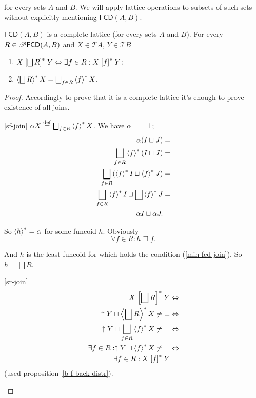 for every sets $A$ and $B$. We will apply lattice operations to
subsets of such sets without explicitly mentioning $\mathsf{FCD}(A,B)$.
\begin{thm}
\label{fcd-join-sets}$\mathsf{FCD}(A,B)$ is a complete lattice (for
every sets $A$ and $B$). For every $R\in\mathscr{P}\mathsf{FCD}(A,B)$
and $X\in\mathscr{T}A$, $Y\in\mathscr{T}B$
\begin{enumerate}
\item \label{sr-join}$X\rsuprel{\bigsqcup R}Y\Leftrightarrow\exists f\in
R:X\rsuprel fY$;
\item \label{sf-join}$\rsupfun{\bigsqcup R}X=\bigsqcup_{f\in R}\rsupfun fX$.
\end{enumerate}
\end{thm}
\begin{proof}
Accordingly \cite{pm:complete-lattice-criteria} to prove that it
is a complete lattice it's enough to prove existence of all joins.
\begin{widedisorder}
\item [{\ref{sf-join}}] $\alpha X\eqdef\bigsqcup_{f\in R}\rsupfun fX$.
We have $\alpha\bot=\bot$;
\begin{align*}
\alpha(I\sqcup J) & =\\
\bigsqcup_{f\in R}\rsupfun f(I\sqcup J) & =\\
\bigsqcup_{f\in R}(\rsupfun fI\sqcup\rsupfun fJ) & =\\
\bigsqcup_{f\in R}\rsupfun fI\sqcup\bigsqcup\rsupfun fJ & =\\
\alpha I\sqcup\alpha J.
\end{align*}



So $\left\langle h\right\rangle ^{\ast}=\alpha$ for some funcoid $h$. Obviously
\begin{equation}
\forall f\in R:h\sqsupseteq f.\label{min-fcd-join}
\end{equation}



And $h$ is the least funcoid for which holds the condition (\ref{min-fcd-join}).
So $h=\bigsqcup R$.

\item [{\ref{sr-join}}] ~
\begin{align*}
X\rsuprel{\bigsqcup R}Y & \Leftrightarrow\\
\uparrow Y\sqcap\rsupfun{\bigsqcup R}X\ne\bot &
\Leftrightarrow\\
\uparrow Y\sqcap\bigsqcup_{f\in R}\rsupfun fX\ne\bot &
\Leftrightarrow\\
\exists f\in R:\uparrow Y\sqcap\rsupfun fX\ne\bot &
\Leftrightarrow\\
\exists f\in R:X\rsuprel fY
\end{align*}
(used proposition~\ref{b-f-back-distr}).
\end{widedisorder}
\end{proof}
